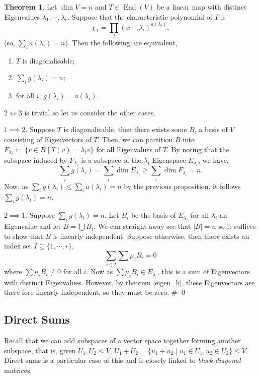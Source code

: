 \documentclass[
]{article}
\theoremstyle{definition}
\newtheorem{theorem}{Theorem}
\theoremstyle{definition}
\begin{document}
\begin{theorem}
  Let \(\dim V = n\) and \(T \in \mathop{\mathrm{End}}(V)\) be a linear map with distinct 
  Eigenvalues \(\lambda_1, \cdots, \lambda_r\). Suppose that the characteristic 
  polynomial of \(T\) is 
  \[\chi_T = \prod_i (x - \lambda_i)^{a(\lambda_i)},\]
  (so, \(\sum_i a(\lambda_i) = n\)). Then the following are equivalent,
  \begin{enumerate}
    \item \(T\) is diagonalisable;
    \item \(\sum_i g(\lambda_i) = n\);
    \item for all \(i\), \(g(\lambda_i) = a(\lambda_i)\).
  \end{enumerate}
\end{theorem}
\proof

\(2 \iff 3\) is trivial so let us consider the other cases.

\(1 \implies 2\). Suppose \(T\) is diagonalisable, then there exists
some \(B\), a basis of \(V\) consisting of Eigenvectors of \(T\). Then,
we can partition \(B\) into
\(F_{\lambda_i} := \{v \in B \mid T(v) = \lambda_i v\}\) for all
Eigenvalues of \(T\). By noting that the subspace induced by
\(F_{\lambda_i}\) is a subspace of the \(\lambda_i\) Eigenspace
\(E_{\lambda_i}\), we have,
\[\sum_i g(\lambda_i) = \sum_i \dim E_{\lambda_i} \ge \sum_i \dim F_{\lambda_i} = n.\]
Now, as \(\sum_i g(\lambda_i) \le \sum_i a(\lambda_i) = n\) by the
previous proposition, it follows \(\sum_i g(\lambda_i) = n\).

\(2 \implies 1\). Suppose \(\sum_i g(\lambda_i) = n\). Let \(B_i\) be
the basis of \(E_{\lambda_i}\) for all \(\lambda_i\) an Eigenvalue and
let \(B = \bigcup B_i\). We can straight away see that
\(\left| B \right| = n\) so it suffices to show that \(B\) is linearly
independent. Suppose otherwise, then there exists an index set
\(I \subseteq \{1, \cdots, r\}\), \[\sum_{i \in I} \sum \mu_i B_i = 0\]
where \(\sum \mu_i B_i \neq 0\) for all \(i\). Now as
\(\sum \mu_i B_i \in E_{\lambda_i}\), this is a sum of Eigenvectors with
distinct Eigenvalues. However, by theorem \ref{eigen_li}, these
Eigenvectors are there fore linearly independent, so they must be zero.
\# \qed

\hypertarget{direct-sums}{%
\subsection{Direct Sums}\label{direct-sums}}

Recall that we can add subspaces of a vector space together forming
another subspace, that is, given \(U_1, U_2 \le V\),
\(U_1 + U_2 = \{u_1 + u_2 \mid u_1 \in U_1, u_2 \in U_2\} \le V\).
Direct sums is a particular case of this and is closely linked to
\emph{block-diagonal} matrices.
\end{document}
